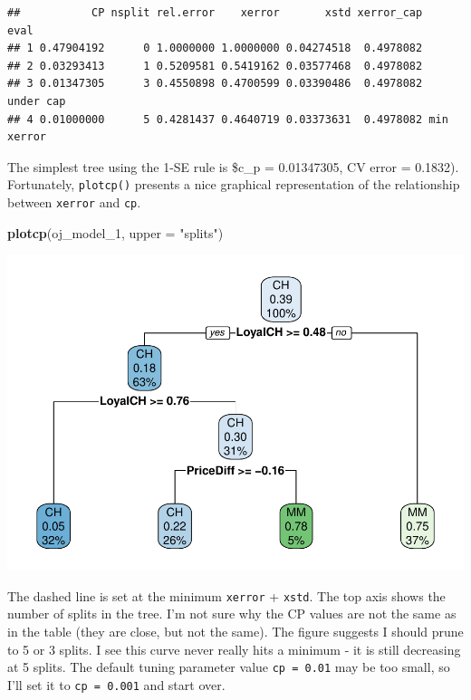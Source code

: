 \documentclass[
]{book}
\newenvironment{Shaded}{\begin{snugshade}}{\end{snugshade}}
\newcommand{\DataTypeTok}[1]{\textcolor[rgb]{0.13,0.29,0.53}{#1}}
\newcommand{\DecValTok}[1]{\textcolor[rgb]{0.00,0.00,0.81}{#1}}
\newcommand{\KeywordTok}[1]{\textcolor[rgb]{0.13,0.29,0.53}{\textbf{#1}}}
\newcommand{\NormalTok}[1]{#1}
\newcommand{\StringTok}[1]{\textcolor[rgb]{0.31,0.60,0.02}{#1}}
\begin{document}
\begin{verbatim}
##           CP nsplit rel.error    xerror       xstd xerror_cap       eval
## 1 0.47904192      0 1.0000000 1.0000000 0.04274518  0.4978082           
## 2 0.03293413      1 0.5209581 0.5419162 0.03577468  0.4978082           
## 3 0.01347305      3 0.4550898 0.4700599 0.03390486  0.4978082  under cap
## 4 0.01000000      5 0.4281437 0.4640719 0.03373631  0.4978082 min xerror
\end{verbatim}

The simplest tree using the 1-SE rule is \$c\_p = 0.01347305, CV error = 0.1832). Fortunately, \texttt{plotcp()} presents a nice graphical representation of the relationship between \texttt{xerror} and \texttt{cp}.

\begin{Shaded}
\begin{Highlighting}[]
\KeywordTok{plotcp}\NormalTok{(oj_model_}\DecValTok{1}\NormalTok{, }\DataTypeTok{upper =} \StringTok{"splits"}\NormalTok{)}
\end{Highlighting}
\end{Shaded}

\includegraphics{data-sci_files/figure-latex/unnamed-chunk-33-1.pdf}

The dashed line is set at the minimum \texttt{xerror} + \texttt{xstd}. The top axis shows the number of splits in the tree. I'm not sure why the CP values are not the same as in the table (they are close, but not the same). The figure suggests I should prune to 5 or 3 splits. I see this curve never really hits a minimum - it is still decreasing at 5 splits. The default tuning parameter value \texttt{cp\ =\ 0.01} may be too small, so I'll set it to \texttt{cp\ =\ 0.001} and start over.
\end{document}
